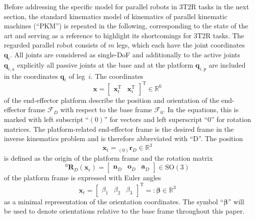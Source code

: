 \documentclass[robotics,article,submit,moreauthors,pdftex]{Definitions/mdpi}
\newcommand{\bm}[1]{\boldsymbol{#1}}
\newcommand{\ortvek}[4]{{ }_{(#1)}{\boldsymbol{#2}}^{#3}_{#4} }
\newcommand{\vek}[3]{\boldsymbol{#1}^{#2}_{#3}}
\newcommand{\rotmat}[2]{{{ }^{#1}\boldsymbol{R}}_{#2}}
\newcommand{\transp}[0]{{\mathrm{T}}}
\newcommand{\ks}[1]{{\mathcal{F}}_{#1}}
\begin{document}
Before addressing the specific model for parallel robots in 3T2R tasks in the next section, the standard kinematics model of kinematics of parallel kinematic machines (``PKM'') is repeated in the following, corresponding to the state of the art \cite{Merlet2006,Gogu2008,BriotKha2015} and serving as a reference to highlight its shortcomings for 3T2R tasks.
The regarded parallel robot consists of $m$ legs, which each have the joint coordinates $\bm{q}_i$.
All joints are considered as single-DoF and additionally to the active joints $\bm{q}_{i,\mathrm{a}}$ explicitly all passive joints at the base and at the platform $\bm{q}_{i,\mathrm{p}}$ are included in the coordinates $\bm{q}_i$ of leg~$i$.
The coordinates
%
\begin{equation}
\bm{x}
=
\begin{bmatrix}
\bm{x}_{\mathrm{t}}^\transp & \bm{x}_{\mathrm{r}}^\transp
\end{bmatrix}^\transp
\in {\mathbb{R}}^{6}
\label{equ:x_def}
\end{equation}
%
of the end-effector platform describe the position and orientation of the end-effector frame  $\ks{D}$ with respect to the base frame $\ks{0}$.
In the equations, this is marked with left subscript ``$(0)$'' for vectors and left superscript ``$0$'' for rotation matrices.
The platform-related end-effector frame is the desired frame in the inverse kinematics problem and is therefore abbreviated with ``D''.
The position 
%
\begin{equation}
\bm{x}_{\mathrm{t}}
=
\ortvek{0}{r}{}{D}
\in {\mathbb{R}}^{3}
\label{equ:xt_def}
\end{equation}  
%
is defined as the origin of the platform frame and the rotation matrix
%
\begin{equation}
\rotmat{0}{D} (\bm{x}_{\mathrm{r}})
=
\begin{bmatrix}\vek{n}{}{D} & \vek{o}{}{D} & \vek{a}{}{D}\end{bmatrix} \in \mathrm{SO(3)}
\label{equ:xr_def_rotmat}
\end{equation}
%
of the platform frame is expressed with Euler angles
%
\begin{equation}
\bm{x}_{\mathrm{r}}
=
\begin{bmatrix}
\beta_1  & \beta_2 & \beta_3
\end{bmatrix}^{\mathrm{T}}
=:
\bm{\beta}
\in {\mathbb{R}}^{3}
\label{equ:xr_def}
\end{equation} 
%
as a minimal representation of the orientation coordinates.
The symbol ``$\bm{\beta}$'' will be used to denote orientations relative to the base frame throughout this paper.
\end{document}
